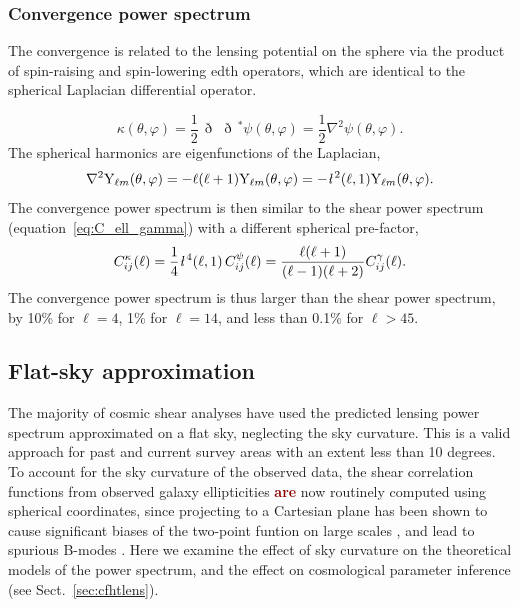 \documentclass[fleqn,usenatbib]{mnras} %
\newcommand{\ellbar}{\hbox{\it \l}\,}
\newcommand{\edth}{\,\eth\,}
\newcommand{\forref}[1]{{\bf\textcolor{darkred}{#1}}}
\begin{document}
\subsubsection{Convergence power spectrum}

The convergence is related to the lensing potential on the sphere via the
product of spin-raising and spin-lowering edth operators, which are identical
to the spherical Laplacian differential operator.

%
\begin{equation}
  \kappa(\theta, \varphi) = \frac 1 2 \edth \edth^\ast \psi(\theta, \varphi) = \frac 1 2 \nabla^2 \psi(\theta, \varphi).
  \label{eq:kappa_psi_spher}
\end{equation}
%
The spherical harmonics are eigenfunctions of the Laplacian,
%
\begin{equation}
  \nabla^2 {\rm Y}_{\ell m}(\theta, \varphi) = - \ell (\ell + 1) {\rm Y}_{\ell m}(\theta, \varphi)
    = - \ellbar^2(\ell, 1) {\rm Y}_{\ell m}(\theta, \varphi).
  \label{eq:nabla_Ylm}
\end{equation}
%
The convergence power spectrum is then similar to the shear power spectrum
(equation~\ref{eq:C_ell_gamma}) with a different spherical pre-factor,
\citep{2000PhRvD..62d3007H,jk12}
%
\begin{equation}
  C^\kappa_{ij}(\ell) = \frac 1 4 \ellbar^4(\ell, 1) \, C^\psi_{ij}(\ell)
    = \frac{\ell (\ell+1)}{(\ell-1)(\ell+2)} C^\gamma_{ij}(\ell) .
  \label{eq:C_ell_kappa_full}
\end{equation}
%
The convergence power spectrum is thus larger than the shear power spectrum, by
10\% for $\ell=4$, 1\% for $\ell = 14$, and less than 0.1\% for $\ell>45$.


\subsection{Flat-sky approximation}

The majority of cosmic shear analyses have used the predicted lensing power
spectrum approximated on a flat sky, neglecting the sky curvature. This is a
valid approach for past and current survey areas with an extent less than 10
degrees. To account for the sky curvature of the observed data, the shear
correlation functions from observed galaxy ellipticities \forref{are} now routinely
computed using spherical coordinates, since projecting to a Cartesian plane has
been shown to cause significant biases of the two-point funtion on large scales
\citep{FSHK08}, and lead to spurious B-modes \citep{asgari/etal:2017}. Here
we examine the effect of sky curvature on the theoretical models of the power
spectrum, and the effect on cosmological parameter inference (see
Sect.~\ref{sec:cfhtlens}).
\end{document}
